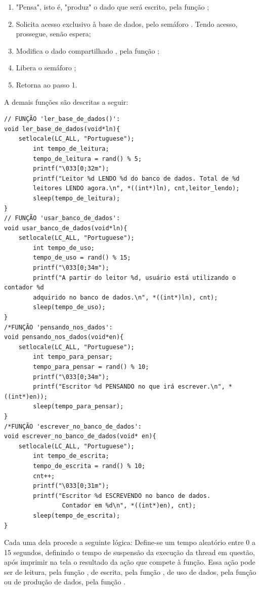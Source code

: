 \documentclass[
	12pt,				%
	openright,			%
	oneside,			%
	a4paper,			%
	chapter=TITLE,		%
	english,			%
	french,				%
	spanish,			%
	brazil				%
	]{abntex2}
\theoremstyle{definition}
\begin{document}
\begin{enumerate}
    \item "Pensa", isto é, "produz" o dado que será escrito, pela função ;
    \item Solicita acesso exclusivo à base de dados, pelo semáforo . Tendo acesso, prossegue, senão espera;
    \item Modifica o dado compartilhado , pela função ;
    \item Libera o semáforo ;
    \item Retorna ao passo 1.
    
\end{enumerate}

A demais funções são descritas a seguir:

\begin{verbatim}
// FUNÇÃO 'ler_base_de_dados()':
void ler_base_de_dados(void*ln){
    setlocale(LC_ALL, "Portuguese");
        int tempo_de_leitura;
        tempo_de_leitura = rand() % 5;
        printf("\033[0;32m");
        printf("Leitor %d LENDO %d do banco de dados. Total de %d 
        leitores LENDO agora.\n", *((int*)ln), cnt,leitor_lendo);
        sleep(tempo_de_leitura);
}
// FUNÇÃO 'usar_banco_de_dados':
void usar_banco_de_dados(void*ln){
    setlocale(LC_ALL, "Portuguese");
        int tempo_de_uso;
        tempo_de_uso = rand() % 15;
        printf("\033[0;34m");
        printf("A partir do leitor %d, usuário está utilizando o contador %d 
        adquirido no banco de dados.\n", *((int*)ln), cnt);
        sleep(tempo_de_uso);
}
/*FUNÇÃO 'pensando_nos_dados':
void pensando_nos_dados(void*en){
    setlocale(LC_ALL, "Portuguese");
        int tempo_para_pensar;
        tempo_para_pensar = rand() % 10;
        printf("\033[0;34m");
        printf("Escritor %d PENSANDO no que irá escrever.\n", *((int*)en));
        sleep(tempo_para_pensar);
}
/*FUNÇÃO 'escrever_no_banco_de_dados':
void escrever_no_banco_de_dados(void* en){
    setlocale(LC_ALL, "Portuguese");
        int tempo_de_escrita;
        tempo_de_escrita = rand() % 10;
        cnt++;
        printf("\033[0;31m");
        printf("Escritor %d ESCREVENDO no banco de dados. 
                Contador em %d\n", *((int*)en), cnt);
        sleep(tempo_de_escrita);
}
\end{verbatim}

Cada uma dela procede a seguinte lógica: Define-se um tempo aleatório entre 0 a 15 segundos, definindo o tempo de suspensão da execução da thread em questão, após imprimir na tela o resultado da ação que compete à função. Essa ação pode ser de leitura, pela função , de escrita, pela função , de uso de dados, pela função  ou de produção de dados, pela função .
\end{document}
